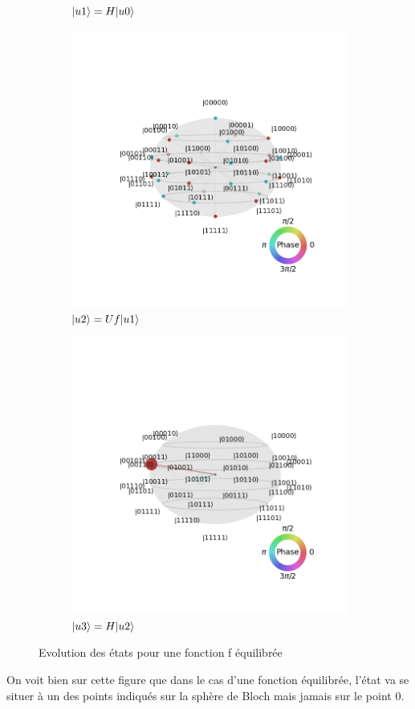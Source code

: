 \documentclass[12pt,a4paper]{article}
\DeclarePairedDelimiter\ket{\lvert}{\rangle}
\begin{document}
\begin{figure}[bth]
\begin{subfigure}[b]{0.3\textwidth}
      \caption{$\ket{u1}=H\ket{u0}$}
  \end{subfigure}
  \begin{subfigure}[b]{0.3\textwidth}
      \centering
      \includegraphics[width=\textwidth]{images/visualization_eq_2_u3.png}
      \caption{$\ket{u2}=Uf\ket{u1}$}
  \end{subfigure}
  \begin{subfigure}[b]{0.3\textwidth}
    \centering
    \includegraphics[width=\textwidth]{images/visualization_eq_2_u4.png}
    \caption{$\ket{u3}=H\ket{u2}$}
\end{subfigure}
     \caption{Evolution des états pour une fonction f équilibrée}
\end{figure}

On voit bien sur cette figure que dans le cas d'une fonction équilibrée, l'état va se situer à un des points indiqués sur la sphère de Bloch mais jamais sur le point 0. 
\end{document}
